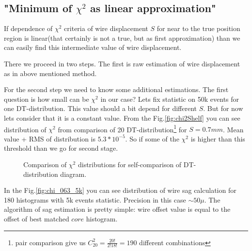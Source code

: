 	

	\subsection{"Minimum of $\chi^2$ as linear approximation"}
	
	If dependence of $\chi^2$ criteria of wire displacement $S$ for near to the true position region is linear(that certainly is not a true, but as first approximation) than we can easily find this intermediate value of wire displacement.
	
	There we proceed in two steps. The first is raw estimation of wire displacement as in above mentioned method.
	
	For the second step we need to know some additional estimations. The first question is how small can be  $\chi^2$ in our case? Lets fix statistic on 50k events for one DT-distribution. This value should a bit depend for different $S$. But for now lets consider that it is a constant value. From the Fig.\ref{fig:chi2Shelf} you can see distribution of $\chi^2$ from comparison of 20 DT-distribution\footnote{pair comparison give us $C_{20}^2 = \frac{20!}{2!18!}=190$ different combinations}  for $S=0.7mm$. Mean value + RMS of distribution is $ 5.3*10^{-5}$. So if some of the $\chi^2$ is higher than this threshold than we go for second stage.
	
	
	\begin{figure}[h!]
		\centering
		\qquad
		\caption{Comparison of $\chi^2$ distributions for self-comparison of DT-distribution diagram.} 
	\end{figure}	
	
	In the Fig.\ref{fig:chi_063_5k} you can see distribution of wire sag calculation for 180 histograms with 5k events statistic. Precision in this case  $\sim 50\mu$. The algorithm of sag estimation is pretty simple: wire offset value is equal to the offset  of best matched  $core$ histogram.

